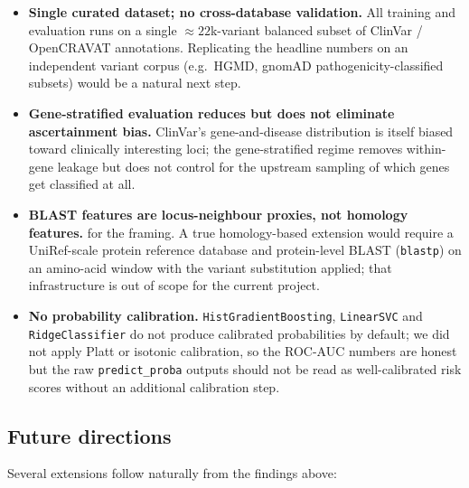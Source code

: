 \documentclass[11pt,a4paper]{article}
\begin{document}
\begin{itemize}[leftmargin=*]
 \item \textbf{Single curated dataset; no cross-database validation.}
 All training and evaluation runs on a single
 $\approx 22$k-variant balanced subset of ClinVar / OpenCRAVAT
 annotations. Replicating the headline numbers on an independent
 variant corpus (e.g.\ HGMD, gnomAD pathogenicity-classified subsets)
 would be a natural next step.
 \item \textbf{Gene-stratified evaluation reduces but does not eliminate
 ascertainment bias.} ClinVar's gene-and-disease distribution is
 itself biased toward clinically interesting loci; the
 gene-stratified regime removes within-gene leakage but does not
 control for the upstream sampling of which genes get classified at all.\item \textbf{BLAST features are locus-neighbour proxies, not homology
 features.} for the framing. A true
 homology-based extension would require a UniRef-scale protein
 reference database and protein-level BLAST (\texttt{blastp}) on an
 amino-acid window with the variant substitution applied; that
 infrastructure is out of scope for the current project.
 \item \textbf{No probability calibration.} \texttt{HistGradientBoosting},
 \texttt{LinearSVC} and \texttt{RidgeClassifier} do not produce
 calibrated probabilities by default; we did not apply Platt or
 isotonic calibration, so the ROC-AUC numbers are honest but the
 raw \texttt{predict\_proba} outputs should not be read as
 well-calibrated risk scores without an additional calibration step.
\end{itemize}

\subsection{Future directions}
\label{sec:future}

Several extensions follow naturally from the findings above:
\end{document}
